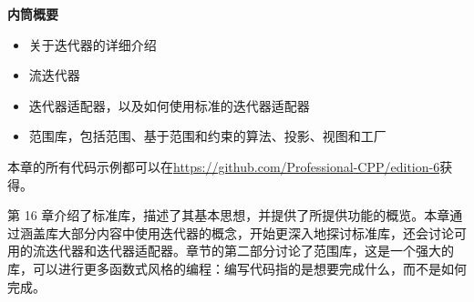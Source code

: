 \noindent
\textbf{内筒概要}

\begin{itemize}
\item
关于迭代器的详细介绍

\item
流迭代器

\item
迭代器适配器，以及如何使用标准的迭代器适配器

\item
范围库，包括范围、基于范围和约束的算法、投影、视图和工厂
\end{itemize}

本章的所有代码示例都可以在\url{https://github.com/Professional-CPP/edition-6}获得。

第 16 章介绍了标准库，描述了其基本思想，并提供了所提供功能的概览。本章通过涵盖库大部分内容中使用迭代器的概念，开始更深入地探讨标准库，还会讨论可用的流迭代器和迭代器适配器。章节的第二部分讨论了范围库，这是一个强大的库，可以进行更多函数式风格的编程：编写代码指的是想要完成什么，而不是如何完成。

